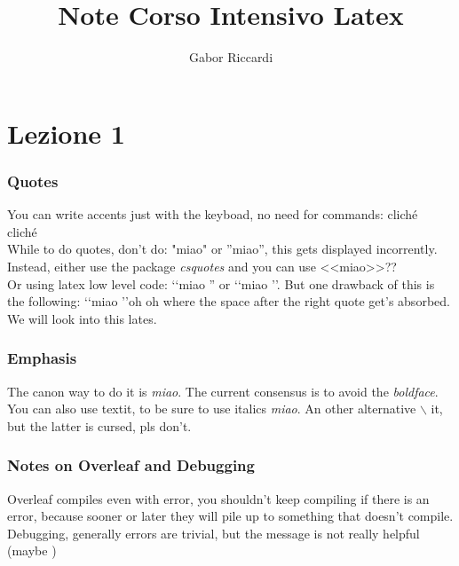 \documentclass[11pt,a4paper,oneside,openany]{book}
\title{Note Corso Intensivo Latex}
\author{Gabor Riccardi}
\begin{document}
\maketitle
\chapter{Lezione 1}
\subsection{Quotes}
You can write accents just with the keyboad, no need for commands:
cliché \\
clich\'e \\
While to do quotes, don't do: "miao" or ''miao'', this gets displayed incorrently.
Instead, either use the package \emph{csquotes} and you can use <<miao>>?? \\ 
Or using latex low level code: \lq\lq miao '' or \lq\lq miao \rq \rq. But one drawback of this is the following: \lq\lq miao \rq \rq oh oh where the space after the right quote get's absorbed. We will look into this lates.
\subsection{Emphasis}
    The canon way to do it is \emph{miao}. The current consensus is to avoid the \emph{boldface}.
    You can also use textit, to be sure to use italics \textit{miao}. An other alternative \(\backslash\) it, but the latter is cursed, pls don't.
    
\subsection{Notes on Overleaf and Debugging}
    Overleaf compiles even with error, you shouldn't keep compiling if there is an error, because sooner or later they will pile up to something that doesn't compile.
    \\ Debugging, generally errors are trivial, but the message is not really helpful (maybe )
\end{document}
